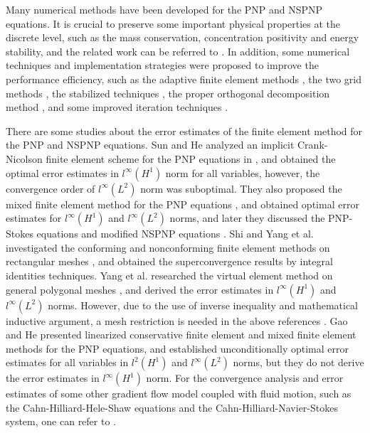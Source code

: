 \documentclass[a4paper,fleqn]{cas-sc}
\numberwithin{equation}{section}
\theoremstyle{definition}
\begin{document}
Many numerical methods have been developed for the PNP and NSPNP equations. It is crucial to preserve some important physical properties at the discrete level, such as the mass conservation, concentration positivity and energy stability, and the related work can be referred to \cite{Flavell2014,He2019,Liu2021,Liu22021,Ding2020,Metti2016,Fu2022,Prohl2009,Prohl2010,Su2022,Liu2017,Shen2021,Huang2021,Gharibi2021,Dehghan2022,Gharibi22021}. In addition, some numerical techniques and implementation strategies were proposed to improve the performance efficiency, such as the adaptive finite element methods \cite{Hao2022,Yang2022,Zhu2022}, the two grid methods \cite{Shen22020}, the stabilized techniques \cite{Wang2021,Li2022}, the proper orthogonal decomposition method \cite{Dehghan22022}, and some improved iteration techniques \cite{Ying2021,Xie2020,Liu32022,Bousquet2018}.

There are some studies about the error estimates of the finite element method for the PNP and NSPNP equations. Sun and He analyzed an implicit Crank-Nicolson finite element scheme for the PNP equations in \cite{Sun2016}, and obtained the optimal error estimates in $l^\infty(H^1)$ norm for all variables, however, the convergence order of $l^\infty(L^2)$ norm was suboptimal. They also proposed the mixed finite element method for the PNP equations \cite{He22017}, and obtained optimal error estimates for $l^\infty(H^1)$ and $l^\infty(L^2)$ norms, and later they discussed the PNP-Stokes equations and modified NSPNP equations \cite{He32018,He42021}. Shi and Yang et al. investigated the conforming and nonconforming finite element methods on rectangular meshes \cite{Shi2019,Shi22021}, and obtained the superconvergence results by integral identities techniques. Yang et al. researched the virtual element method on general polygonal meshes \cite{Yang22022}, and derived the error estimates in $l^\infty(H^1)$ and $l^\infty(L^2)$ norms. However, due to the use of inverse inequality and mathematical inductive argument, a mesh restriction is needed in the above references \cite{Sun2016,He22017,He32018,He42021,Shi2019,Shi22021,Yang22022}. Gao and He \cite{Gao2017,Gao22018} presented linearized conservative finite element and mixed finite element methods for the PNP equations, and established unconditionally optimal error estimates for all variables in $l^2(H^1)$ and $l^\infty(L^2)$ norms, but they do not derive the error estimates in $l^\infty(H^1)$ norm. For the convergence analysis and error estimates of some other gradient flow model coupled with fluid motion, such as the Cahn-Hilliard-Hele-Shaw equations and the Cahn-Hilliard-Navier-Stokes system, one can refer to \cite{Chen2016,Chen22019,Liu42017,Diegel2017}.
\end{document}
